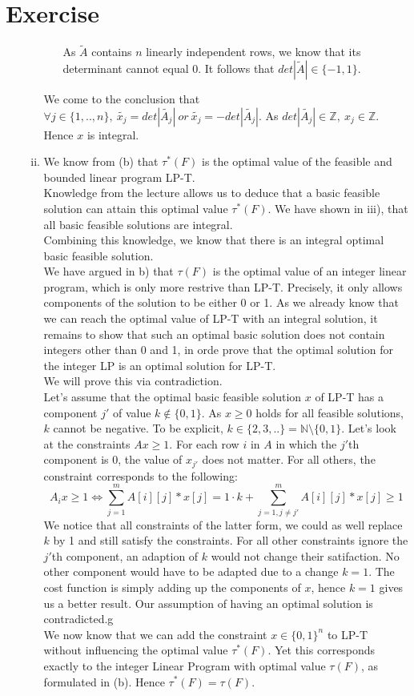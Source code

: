 \documentclass{article}
\newcounter{homeworkProblemCounter} %
\newcommand{\homeworkProblemName}{}
\newenvironment{homeworkProblem}[1][Exercise \arabic{homeworkProblemCounter}]{ %
\stepcounter{homeworkProblemCounter} %
\renewcommand{\homeworkProblemName}{#1} %
\section{\homeworkProblemName} %
}{
}
\begin{document}
\begin{homeworkProblem}
\begin{enumerate}[(a)]
\begin{enumerate}[(i)]
\begin{enumerate}
			As \(\tilde{A}\) contains \(n\) linearly independent rows, we know that its determinant cannot equal 0. 
			It follows that \({det|\tilde{A}|} \in \{-1,1\}\).
	\end{enumerate}
	We come to the conclusion that \(\forall j \in \{1,..,n\},\ \tilde{x_j} = det|\tilde{A_j}|\ or\ \tilde{x_j} = -det|\tilde{A_j}|\). As \(det|\tilde{A_j}| \in \mathbb{Z},\ x_j \in \mathbb{Z}\). Hence \(x\) is integral.
	
	\item
		We know from (b) that \(\tau^*(F)\) is the optimal value of the feasible and bounded linear program LP-T. \\
		Knowledge from the lecture allows us to deduce that a basic feasible solution can attain this optimal value \(\tau^*(F)\).
		We have shown in iii), that all basic feasible solutions are integral. \\
		Combining this knowledge, we know that there is an integral optimal basic feasible solution. \\
		We have argued in b) that \(\tau(F)\) is the optimal value of an integer linear program, which is only more restrive than LP-T. Precisely, it only allows components of the solution to be either 0 or 1. As we already know that we can reach the optimal value of LP-T with an integral solution, it remains to show that such an optimal basic solution does not contain integers other than 0 and 1, in orde prove that the optimal solution for the integer LP is an optimal solution for LP-T. \\
		We will prove this via contradiction. \\
		Let's assume that the optimal basic feasible solution \(x\) of LP-T has a component \(j'\) of value \(k \notin \{0,1\}\).	As \(x \geq 0\) holds for all feasible solutions, \(k\) cannot be negative. To be explicit, \(k \in \{2,3,..\} = \mathbb{N} \setminus \{0,1\}\). Let's look at the constraints \(Ax \geq 1\). For each row \(i\) in \(A\) in which the \(j'\)th component is 0, the value of \(x_{j'}\) does not matter. For all others, the constraint corresponds to the following: 
		\[ A_ix \geq 1 \Leftrightarrow \sum_{j=1}^m A[i][j]*x[j] = 1 \cdot k + \sum_{j=1, j \neq j'}^m A[i][j]*x[j] \geq 1\]
		We notice that all constraints of the latter form, we could as well replace \(k\) by 1 and still satisfy the constraints. For all other constraints ignore the \(j'\)th component, an adaption of \(k\) would not change their satifaction. No other component would have to be adapted due to a change \(k=1\). The cost function is simply adding up the components of \(x\), hence \(k=1\) gives us a better result. Our assumption of having an optimal solution is contradicted.g\\
		We now know that we can add the constraint \(x \in \{0,1\}^n\) to LP-T without influencing the optimal value \(\tau^*(F)\). Yet this corresponds exactly to the integer Linear Program with optimal value \(\tau(F)\), as formulated in (b). Hence \(\tau^*(F) = \tau(F)\). 
		

\end{enumerate}
\end{enumerate}
\end{homeworkProblem}
\end{document}
